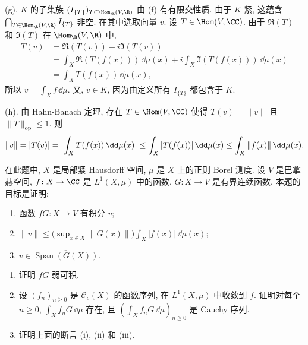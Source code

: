 \begin{solution}
(g). $K$ 的子集族 $(I_{\{T\}})_{T \in \Hom_{\R}(V, \R)}$ 由 (f) 有有限交性质. 由于 $K$ 紧, 这蕴含 $\bigcap_{T \in \Hom_{\R}(V, \R)}I_{\{T\}}$ 非空. 在其中选取向量 $v$. 设 $T \in \Hom(V, \CC)$. 由于 $\Re(T)$ 和 $\Im(T)$ 在 $\Hom_{\R}(V, \R)$ 中,
\begin{align*}
T(v) &= \Re(T(v)) + i\Im(T(v)) \\
&= \int_X \Re(T(f(x)))\,\dd\mu(x) + i\int_X \Im(T(f(x)))\,\dd\mu(x) \\
&= \int_X T(f(x))\,\dd\mu(x),
\end{align*}
所以 $v = \int_X f\,\dd\mu$. 又, $v \in K$, 因为由定义所有 $I_{\{T\}}$ 都包含于 $K$.

(h). 由 Hahn-Banach 定理, 存在 $T \in \Hom(V, \CC)$ 使得 $T(v) = \|v\|$ 且 $\|T\|_{\mathrm{op}} \leq 1$. 则
\[
\|v\| = |T(v)| = \Bigl|\int_X T(f(x))\,\dd\mu(x)\Bigr| \leq \int_X |T(f(x))|\,\dd\mu(x) \leq \int_X \|f(x)\|\,\dd\mu(x).
\]
\end{solution}

\begin{exercise}[$L^1$ 函数乘有界连续函数的积分]
\label{ex:I.5.6.3}
在此题中, $X$ 是局部紧 Hausdorff 空间, $\mu$ 是 $X$ 上的正则 Borel 测度. 设 $V$ 是巴拿赫空间, $f \colon X \to \CC$ 是 $L^1(X, \mu)$ 中的函数, $G \colon X \to V$ 是有界连续函数.
本题的目标是证明:
\begin{enumerate}
\item[(i)] 函数 $fG \colon X \to V$ 有积分 $v$;
\item[(ii)] $\|v\| \leq \bigl(\sup_{x \in X}\|G(x)\|\bigr)\int_X |f(x)|\,\dd\mu(x)$;
\item[(iii)] $v \in \overline{\operatorname{Span}(G(X))}$.
\end{enumerate}
\begin{enumerate}
\item[(a)] 证明 $fG$ 弱可积.
\item[(b)] 设 $(f_n)_{n \geq 0}$ 是 $\mathcal{C}_c(X)$ 的函数序列, 在 $L^1(X, \mu)$ 中收敛到 $f$. 证明对每个 $n \geq 0$, $\int_X f_nG\,\dd\mu$ 存在, 且 $(\int_X f_nG\,\dd\mu)_{n \geq 0}$ 是 Cauchy 序列.
\item[(c)] 证明上面的断言 (i), (ii) 和 (iii).
\end{enumerate}
\end{exercise}

